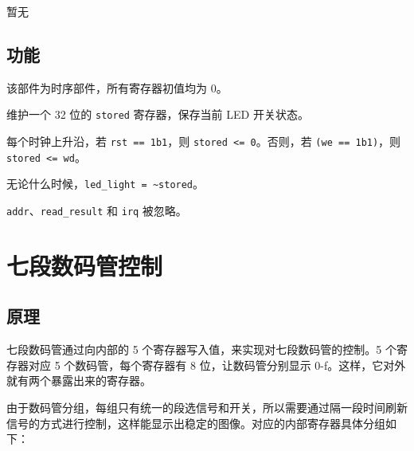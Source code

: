 \documentclass[12pt,AutoFakeBold,AutoFakeSlant]{article}
\newcommand{\ms}[1]{\texttt{#1}}
\begin{document}
暂无

\hypertarget{ux529fux80fd-1}{%
\subsection{功能}\label{ux529fux80fd-1}}

该部件为时序部件，所有寄存器初值均为 0。

维护一个 32 位的 \texttt{stored} 寄存器，保存当前 LED 开关状态。

每个时钟上升沿，若 \texttt{rst\ ==\ 1\textquotesingle{}b1}，则
\texttt{stored\ \textless{}=\ 0}。否则，若
\texttt{(we\ ==\ 1\textquotesingle{}b1)}，则  
\texttt{stored\ \textless{}=\ wd}。

无论什么时候，\texttt{led\_light\ =\ \textasciitilde{}stored}。

\ms{addr}、\ms{read\_result} 和 \ms{irq} 被忽略。

\hypertarget{ux4e03ux6bb5ux6570ux7801ux7ba1ux63a7ux5236}{%
\section{七段数码管控制}\label{ux4e03ux6bb5ux6570ux7801ux7ba1ux63a7ux5236}}

\hypertarget{ux539fux7406-2}{%
\subsection{原理}\label{ux539fux7406-2}}

七段数码管通过向内部的 5 个寄存器写入值，来实现对七段数码管的控制。5 个寄存器对应 5 个数码管，每个寄存器有 8 位，让数码管分别显示
0-f。这样，它对外就有两个暴露出来的寄存器。

由于数码管分组，每组只有统一的段选信号和开关，所以需要通过隔一段时间刷新信号的方式进行控制，这样能显示出稳定的图像。对应的内部寄存器具体分组如下：
\end{document}
